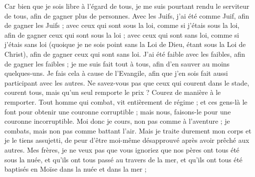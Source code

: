 \begin{multicols}{2}
Car bien que je sois libre à l'égard de tous, je me suis pourtant rendu le serviteur de tous, afin de gagner plus de personnes.
Avec les Juifs, j’ai été comme Juif, afin de gagner les Juifs ; avec ceux qui sont sous la loi, comme si j'étais sous la loi, afin de gagner ceux qui sont sous la loi ;
avec ceux qui sont sans loi, comme si j'étais sans loi (quoique je ne sois point sans la Loi de Dieu, étant sous la Loi de Christ), afin de gagner ceux qui sont sans loi.
J’ai été faible avec les faibles, afin de gagner les faibles ; je me suis fait tout à tous, afin d’en sauver au moins quelques-uns.
Je fais cela à cause de l'Evangile, afin que j'en sois fait aussi participant avec les autres.
Ne savez-vous pas que ceux qui courent dans le stade, courent tous, mais qu’un seul remporte le prix ? Courez de manière à le remporter.
Tout homme qui combat, vit entièrement de régime ; et ces gens-là le font pour obtenir une couronne corruptible ; mais nous, faisons-le pour une couronne incorruptible.
Moi donc je cours, non pas comme à l’aventure ; je combats, mais non pas comme battant l'air.
Mais je traite durement mon corps et je le tiens assujetti, de peur d’être moi-même désapprouvé après avoir prêché aux autres.
\VerseOne{}Mes frères, je ne veux pas que vous ignoriez que nos pères ont tous été sous la nuée, et qu'ils ont tous passé au travers de la mer,
et qu'ils ont tous été baptisés en Moïse dans la nuée et dans la mer ;

\end{multicols}
